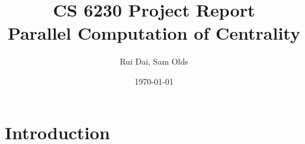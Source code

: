 \documentclass[11pt,a4paper,titlepage]{article}
\title{CS 6230 Project Report\\\textbf{Parallel Computation of  Centrality}}
\author{Rui Dai, Sam Olds}
\date{\today}
\begin{document}
\maketitle
\newpage





\section{Introduction} %
\label{sec:intro}
\end{document}
